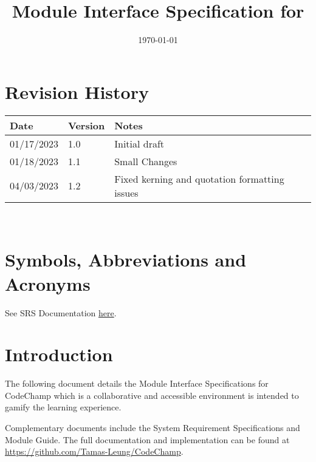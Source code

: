 \documentclass[12pt, titlepage]{article}
\begin{document}
\title{Module Interface Specification for \progname{}}

\author{\authname}

\date{\today}

\maketitle


\section{Revision History}

\begin{tabularx}{\textwidth}{p{3cm}p{2cm}X}
\toprule {\bf Date} & {\bf Version} & {\bf Notes}\\
\midrule
01/17/2023 & 1.0 & Initial draft\\
01/18/2023 & 1.1 & Small Changes\\
04/03/2023 & 1.2 & Fixed kerning and quotation formatting issues\\
\bottomrule
\end{tabularx}

~\newpage

\section{Symbols, Abbreviations and Acronyms}

See SRS Documentation \href{https://github.com/Tamas-Leung/CodeChamp/tree/main/docs/SRS}{here}.

\newpage

\tableofcontents

\newpage


\section{Introduction}

The following document details the Module Interface Specifications for CodeChamp which is a collaborative and accessible environment is intended to gamify the learning experience.

Complementary documents include the System Requirement Specifications
and Module Guide.  The full documentation and implementation can be
found at \url{https://github.com/Tamas-Leung/CodeChamp}. 
\end{document}
